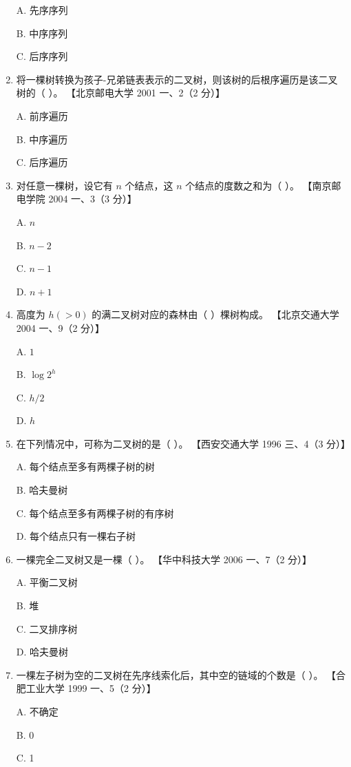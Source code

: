 \documentclass[lang=cn,newtx,10pt,scheme=chinese]{elegantbook}
\begin{document}
\begin{enumerate}
    A. 先序序列  

    B. 中序序列  

    C. 后序序列  

    \item 将一棵树转换为孩子-兄弟链表表示的二叉树，则该树的后根序遍历是该二叉树的（ ）。  
    【北京邮电大学 2001 一、2（2 分）】  

    A. 前序遍历  

    B. 中序遍历  

    C. 后序遍历  

    \item 对任意一棵树，设它有 $n$ 个结点，这 $n$ 个结点的度数之和为（ ）。  
    【南京邮电学院 2004 一、3（3 分）】  

    A. $n$  

    B. $n - 2$  

    C. $n - 1$  

    D. $n + 1$  

    \item 高度为 $h (> 0)$ 的满二叉树对应的森林由（ ）棵树构成。  
    【北京交通大学 2004 一、9（2 分）】  

    A. $1$  

    B. $\log2^h$  

    C. $h/2$  

    D. $h$  

    \item 在下列情况中，可称为二叉树的是（ ）。  
    【西安交通大学 1996 三、4（3 分）】  

    A. 每个结点至多有两棵子树的树  

    B. 哈夫曼树  

    C. 每个结点至多有两棵子树的有序树  

    D. 每个结点只有一棵右子树  

    \item 一棵完全二叉树又是一棵（ ）。  
    【华中科技大学 2006 一、7（2 分）】  

    A. 平衡二叉树  

    B. 堆  

    C. 二叉排序树  

    D. 哈夫曼树  

    \item 一棵左子树为空的二叉树在先序线索化后，其中空的链域的个数是（ ）。  
    【合肥工业大学 1999 一、5（2 分）】 

    A. 不确定  

    B. 0  

    C. 1  


\end{enumerate}
\end{document}
